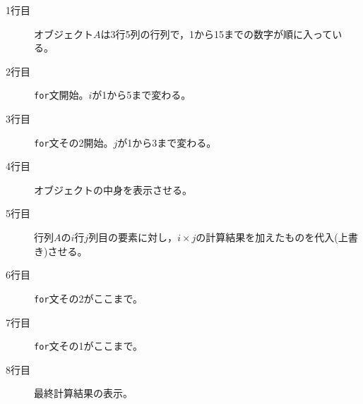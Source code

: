 \begin{description}
	\item[1行目] オブジェクト$A$は3行5列の行列で，1から15までの数字が順に入っている。
	\item[2行目] \texttt{for}文開始。$i$が1から5まで変わる。
	\item[3行目] \texttt{for}文その2開始。$j$が1から3まで変わる。
	\item[4行目] オブジェクトの中身を表示させる。
	\item[5行目] 行列$A$の$i$行$j$列目の要素に対し，$i\times j$の計算結果を加えたものを代入(上書き)させる。
	\item[6行目] \texttt{for}文その2がここまで。
	\item[7行目] \texttt{for}文その1がここまで。
	\item[8行目] 最終計算結果の表示。
\end{description}
